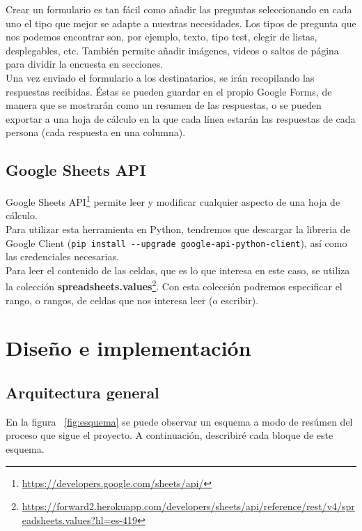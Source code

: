 \documentclass[a4paper, 12pt]{book}
\begin{document}
Crear un formulario es tan fácil como añadir las preguntas seleccionando en cada uno el tipo que mejor se adapte a nuestras necesidades. Los tipos de pregunta que nos podemos encontrar son, por ejemplo, texto, tipo test, elegir de listas, desplegables, etc. También permite añadir imágenes, videos o saltos de página para dividir la encuesta en secciones.\\

Una vez enviado el formulario a los destinatarios, se irán recopilando las respuestas recibidas. Éstas se pueden guardar en el propio Google Forms, de manera que se mostrarán como un resumen de las respuestas, o se pueden exportar a una hoja de cálculo en la que cada línea estarán las respuestas de cada persona (cada respuesta en una columna).


\section{Google Sheets API}
\label{sec:googlesheet}

Google Sheets API\footnote{\url{https://developers.google.com/sheets/api/}} permite leer y modificar cualquier aspecto de una hoja de cálculo.\\

Para utilizar esta herramienta en Python, tendremos que descargar la libreria de Google Client (\verb"pip install --upgrade google-api-python-client"), así como las credenciales necesarias.\\

Para leer el contenido de las celdas, que es lo que interesa en este caso, se utiliza la colección \textbf{spreadsheets.values}\footnote{\url{https://forward2.herokuapp.com/developers/sheets/api/reference/rest/v4/spreadsheets.values?hl=es-419}}. Con esta colección podremos especificar el rango, o rangos, de celdas que nos interesa leer (o escribir).



\cleardoublepage
\chapter{Diseño e implementación}
\label{chap:diseño}

\section{Arquitectura general}
\label{sec:arquitectura}
En la figura ~\ref{fig:esquema} se puede observar un esquema a modo de resúmen del proceso que sigue el proyecto. A continuación, describiré cada bloque de este esquema.
\end{document}
